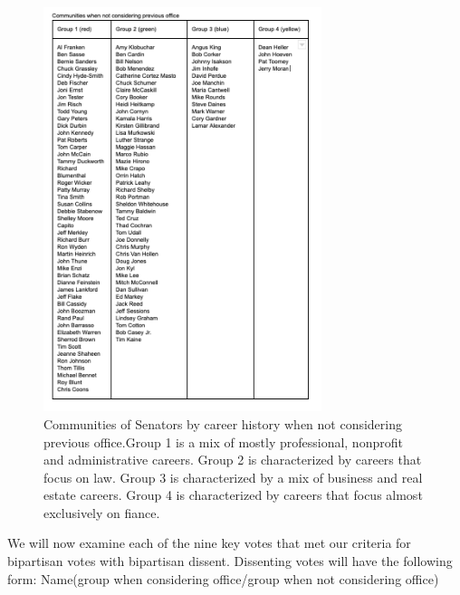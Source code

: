\documentclass[11pt,twocolumn]{article}
\begin{document}
\begin{figure}[H]
    \centering
    \includegraphics[width=3.2in]{comm_no_office}
    \caption{{Communities of Senators by career history when not considering previous office.\newline Group 1 is a mix of mostly professional, nonprofit and administrative careers. \newline Group 2 is characterized by careers that focus on law. \newline Group 3 is characterized by a mix of business and real estate careers. \newline Group 4 is characterized by careers that focus almost exclusively on fiance.}}
    \label{fig:ds}
\end{figure}
\pagebreak
We will now examine each of the nine key votes that met our criteria for bipartisan votes with bipartisan dissent. Dissenting votes will have the following form: Name(group when considering office/group when not considering office)
\end{document}
